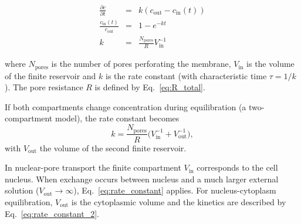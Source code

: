 \documentclass[10pt, a4paper]{article}
\begin{document}
\begin{multicols}{2}
\begin{eqnarray}
    \frac{\partial c}{\partial t} &=& k (c_{\text{out}} - c_{\text{in}}(t)) \\
    \frac{c_{\text{in}}(t)}{c_{\text{out}}} &=& 1 - e^{-kt} \label{eq:kinetics} \\
    k &=& \frac{N_{\text{pores}}}{R} V_{\text{in}}^{-1}
    \label{eq:rate_constant}
\end{eqnarray}

where $N_{\text{pores}}$ is the number of pores perforating the membrane,
$V_{\text{in}}$ is the volume of the finite reservoir and 
$k$ is the rate constant (with characteristic time $\tau = 1/k$).
The pore resistance $R$ is defined by Eq.~\ref{eq:R_total}.


If both compartments change concentration during equilibration
(a two-compartment model), the rate constant becomes
\begin{equation}
  k = \frac{N_{\text{pores}}}{R}
      \bigl(V_{\text{in}}^{-1}+V_{\text{out}}^{-1}\bigr),
  \label{eq:rate_constant_2}
\end{equation}
with $V_{\text{out}}$ the volume of the second finite reservoir.


In nuclear-pore transport the finite compartment $V_{\text{in}}$
corresponds to the cell nucleus.  
When exchange occurs between nucleus and a much larger external
solution ($V_{\text{out}}\!\to\!\infty$), Eq.~\ref{eq:rate_constant}
applies.
For nucleus-cytoplasm equilibration, $V_{\text{out}}$ is the
cytoplasmic volume and the kinetics are described by
Eq.~\ref{eq:rate_constant_2}.


\end{multicols}
\end{document}
